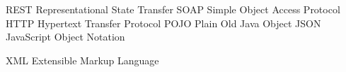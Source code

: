 	{REST}	{Representational State Transfer}
	{SOAP}	{Simple Object Access Protocol}
	{HTTP}	{Hypertext Transfer Protocol}
	{POJO}	{Plain Old Java Object}
	{JSON}	{JavaScript Object Notation}

	{XML}	{Extensible Markup Language}

